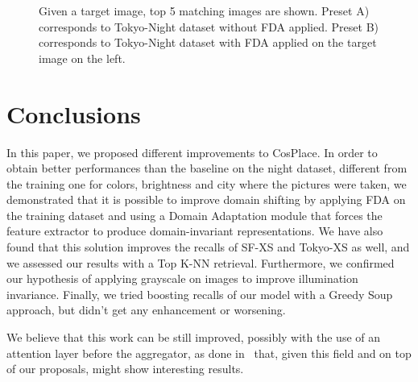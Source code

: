 \documentclass[10pt,twocolumn,letterpaper]{article}
\begin{document}
\begin{figure*}[t]
\centering
  \begin{subfigure}{1.0\linewidth}
    \centering
  \end{subfigure}
      \caption{Given a target image, top 5 matching images are shown. Preset A) corresponds to Tokyo-Night dataset without FDA applied.
Preset B) corresponds to Tokyo-Night dataset with FDA applied on the target image on the left.}
  \hfill
  \label{fig:tokyonighttopknn}
\end{figure*}

\section{Conclusions}
In this paper, we proposed different improvements to CosPlace.
In order to obtain better performances than the baseline on the night dataset, different from the training one for colors, brightness and city where the pictures were taken, we demonstrated that it is possible to improve domain shifting by applying FDA on the training dataset and using a Domain Adaptation module that forces the feature extractor to produce domain-invariant representations. We have also found that this solution improves the recalls of SF-XS and Tokyo-XS as well, and we assessed our results with a Top K-NN retrieval.
\newline
Furthermore, we confirmed our hypothesis of applying grayscale on images to improve illumination invariance.
\newline
Finally, we tried boosting recalls of our model with a Greedy Soup approach, but didn't get any enhancement or worsening.
\newline

We believe that this work can be still improved, possibly with the use of an attention layer before the aggregator, as done in~\cite{adageo} that, given this field and on top of our proposals, might show interesting results.


{\small
\clearpage


}
\end{document}
